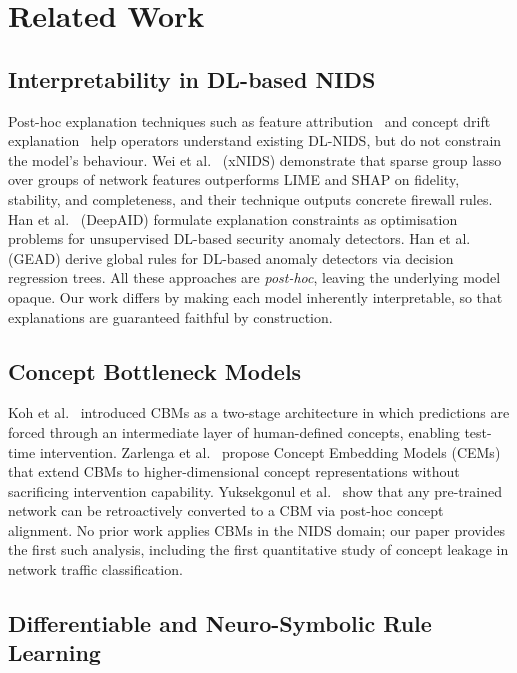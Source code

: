 \documentclass[conference]{IEEEtran}
\begin{document}
\section{Related Work}

\subsection{Interpretability in DL-based NIDS}

Post-hoc explanation techniques such as feature
attribution~\cite{wei2023xnids} and concept drift
explanation~\cite{yang2021cade} help operators understand existing
DL-NIDS, but do not constrain the model's behaviour.
Wei et al.~\cite{wei2023xnids} (xNIDS) demonstrate that sparse group
lasso over groups of network features outperforms LIME and SHAP on
fidelity, stability, and completeness, and their technique outputs
concrete firewall rules.
Han et al.~\cite{han2021deepaid} (DeepAID) formulate explanation
constraints as optimisation problems for unsupervised DL-based security
anomaly detectors.
Han et al.~\cite{han2024gead} (GEAD) derive global rules for DL-based
anomaly detectors via decision regression trees.
All these approaches are \emph{post-hoc}, leaving the underlying model
opaque. Our work differs by making each model inherently interpretable,
so that explanations are guaranteed faithful by construction.

\subsection{Concept Bottleneck Models}

Koh et al.~\cite{koh2020concept} introduced CBMs as a two-stage
architecture in which predictions are forced through an intermediate
layer of human-defined concepts, enabling test-time intervention.
Zarlenga et al.~\cite{zarlenga2022concept} propose Concept Embedding
Models (CEMs) that extend CBMs to higher-dimensional concept
representations without sacrificing intervention capability.
Yuksekgonul et al.~\cite{yuksekgonul2023posthoc} show that any
pre-trained network can be retroactively converted to a CBM via
post-hoc concept alignment.
No prior work applies CBMs in the NIDS domain; our paper provides the
first such analysis, including the first quantitative study of concept
leakage in network traffic classification.

\subsection{Differentiable and Neuro-Symbolic Rule Learning}
\end{document}
